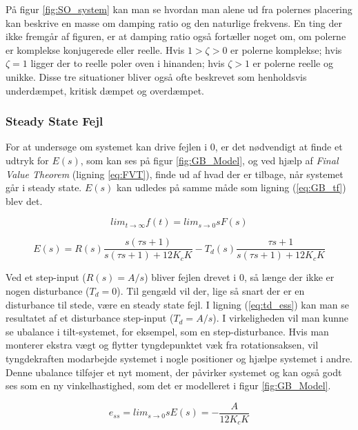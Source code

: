 På figur \ref{fig:SO_system} kan man se hvordan man alene ud fra polernes placering kan beskrive en masse om damping ratio og den naturlige frekvens. En ting der ikke fremgår af figuren, er at damping ratio også fortæller noget om, om polerne er komplekse konjugerede eller reelle. Hvis $1>\zeta>0$ er polerne komplekse; hvis $\zeta=1$ ligger der to reelle poler oven i hinanden; hvis $\zeta>1$ er polerne reelle og unikke. Disse tre situationer bliver også ofte beskrevet som henholdsvis underdæmpet, kritisk dæmpet og overdæmpet.




\subsubsection{Steady State Fejl}

For at undersøge om systemet kan drive fejlen i 0, er det nødvendigt at finde et udtryk for $E(s)$, som kan ses på figur \ref{fig:GB_Model}, og ved hjælp af \textit{Final Value Theorem} (ligning \ref{eq:FVT}), finde ud af hvad der er tilbage, når systemet går i steady state. $E(s)$ kan udledes på samme måde som ligning (\ref{eq:GB_tf}) blev det.

\begin{equation} \label{eq:FVT}
lim_{t \to \infty} f(t) = lim_{s \to 0} sF(s)
\end{equation}

\begin{equation} \label{eq:ess}
E(s)=R(s)\frac{s(\tau s+1)}{s(\tau s+1)+12K_{c}K}-T_{d}(s)\frac{\tau s+1}{s(\tau s+1)+12K_{c}K}
\end{equation}

Ved et step-input ($R(s)=A/s$) bliver fejlen drevet i 0, så længe der ikke er nogen disturbance ($T_{d}=0$). Til gengæld vil der, lige så snart der er en disturbance til stede, være en steady state fejl. I ligning (\ref{eq:td_ess}) kan man se resultatet af et disturbance step-input ($T_{d}=A/s$). I virkeligheden vil man kunne se ubalance i tilt-systemet, for eksempel, som en step-disturbance. Hvis man monterer ekstra vægt og flytter tyngdepunktet væk fra rotationsaksen, vil tyngdekraften modarbejde systemet i nogle positioner og hjælpe systemet i andre. Denne ubalance tilføjer et nyt moment, der påvirker systemet og kan også godt ses som en ny vinkelhastighed, som det er modelleret i figur \ref{fig:GB_Model}.

\begin{equation}\label{eq:td_ess}
e_{ss}=lim_{s \to 0} sE(s)=-\frac{A}{12K_{c}K}
\end{equation}

